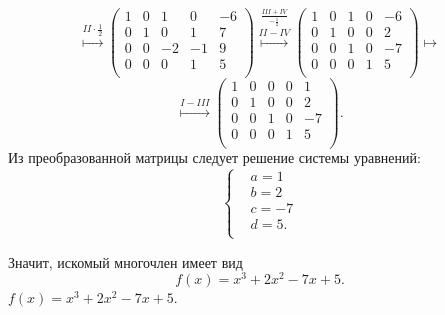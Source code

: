 \documentclass[a4paper,12pt]{article}
\begin{document}
$$ \overset{II \cdot \frac{1}{2}}{\longmapsto}
\left(\begin{array}{cccc|c}
1 & 0 & 1 & 0 & -6 \\
0 & 1 & 0 & 1 & 7 \\
0 & 0 & -2 & -1 & 9 \\
0 & 0 & 0 & 1 & 5 \\
\end{array} \right)
\overset{\frac{III+IV}{-\frac{1}{2}}}{\overset{II-IV}{\longmapsto}}
\left(\begin{array}{cccc|c}
1 & 0 & 1 & 0 & -6 \\
0 & 1 & 0 & 0 & 2 \\
0 & 0 & 1 & 0 & -7 \\
0 & 0 & 0 & 1 & 5 \\
\end{array} \right)
\longmapsto
$$
$$ \overset{I -III}{\longmapsto}
\left(\begin{array}{cccc|c}
1 & 0 & 0 & 0 & 1 \\
0 & 1 & 0 & 0 & 2 \\
0 & 0 & 1 & 0 & -7 \\
0 & 0 & 0 & 1 & 5 \\
\end{array} \right) .
$$
Из преобразованной матрицы следует решение системы уравнений:
$$
\left\{
\begin{aligned}
&a = 1\\
&b = 2\\
&c = -7 \\
&d = 5 .\\
\end{aligned}
\right.
$$

Значит, искомый многочлен имеет вид
$$f(x) = x^3 + 2x^2 -7x + 5.$$
\vspace{1ex}
 $f(x) = x^3 + 2x^2 -7x + 5$.
\newpage
\end{document}
